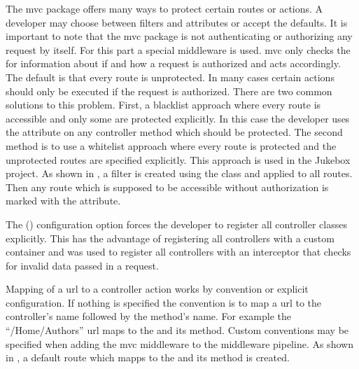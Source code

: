 The \gls{mvc} package offers many ways to protect certain routes or actions. A developer may choose between filters and attributes or accept the defaults. It is important to note that the \gls{mvc} package is not authenticating or authorizing any request by itself. For this part a special middleware is used. \gls{mvc} only checks the  for information about if and how a request is authorized and acts accordingly. The default is that every route is unprotected. In many cases certain actions should only be executed if the request is authorized. There are two common solutions to this problem. First, a blacklist approach where every route is accessible and only some are protected explicitly. In this case the developer uses the  attribute on any controller method which should be protected. The second method is to use a whitelist approach where every route is protected and the unprotected routes are specified explicitly. This approach is used in the Jukebox project. As shown in , a filter is created using the  class and applied to all routes. Then any route which is supposed to be accessible without authorization is marked with the \lstcode{[AllowAnonymous]} attribute.

The  () configuration option forces the developer to register all controller classes explicitly. This has the advantage of registering all controllers with a custom container and was used to register all controllers with an interceptor that checks for invalid data passed in a request.




Mapping of a \gls{url} to a controller action works by convention or explicit configuration. If nothing is specified the convention is to map a \gls{url} to the controller's name followed by the method's name. For example the \enquote{/Home/Authors} \gls{url} maps to the  and its  method. Custom conventions may be specified when adding the \gls{mvc} middleware to the middleware pipeline. As shown in , a default route which mapps to the  and its  method is created.


